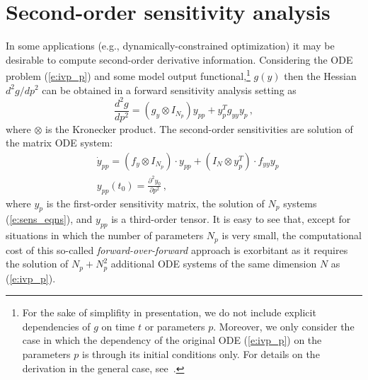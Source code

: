 \section{Second-order sensitivity analysis}\label{ss:hess_sensi}
In some applications (e.g., dynamically-constrained optimization) it may
be desirable to compute second-order derivative information. Considering 
the ODE problem (\ref{e:ivp_p}) and some model output
functional,\footnote{For the sake of simplifity in presentation, we do not 
include explicit dependencies of $g$ on time $t$ or parameters $p$.
Moreover, we only consider the case in which the dependency of the original
ODE (\ref{e:ivp_p}) on the parameters $p$ is through its initial conditions only.
For details on the derivation in the general case, see~\cite{OzBa:05}.}
$g(y)$ then the Hessian $d^2g/dp^2$ can be obtained in a forward sensitivity
analysis setting as
\begin{equation*}
\frac{d^2 g}{d p^2} = \left(g_y \otimes I_{N_p} \right ) y_{pp} + y_p^T g_{yy} y_p \, ,
\end{equation*}
where $\otimes$ is the Kronecker product. The second-order sensitivities are
solution of the matrix ODE system:
\begin{equation*}
  \begin{split}
    & {\dot y}_{pp} = \left( f_y \otimes I_{N_p} \right) \cdot y_{pp} + 
    \left( I_N \otimes y_p^T \right) \cdot f_{yy} y_p \\
    & y_{pp}(t_0) = \frac{\partial^2 y_0}{\partial p^2} \, ,
  \end{split}
\end{equation*}
where $y_p$ is the first-order sensitivity matrix, the solution of $N_p$ 
systems (\ref{e:sens_eqns}), and $y_{pp}$ is a third-order tensor.
It is easy to see that, except for situations in which the number of parameters
$N_p$ is very small, the computational cost of this so-called {\em forward-over-forward} 
approach is exorbitant as it requires the solution of $N_p + N_p^2$ additional
ODE systems of the same dimension $N$ as (\ref{e:ivp_p}).

